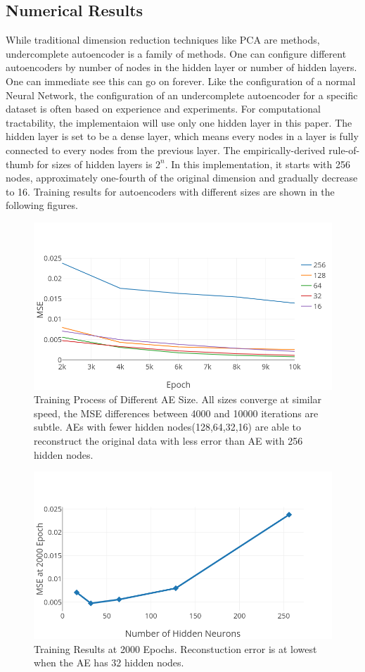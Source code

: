 \documentclass[11pt,a4paper]{article}
\theoremstyle{definition}
\numberwithin{equation}{section}
\begin{document}
	\subsection{Numerical Results}\label{sec:data_ana_res}
	While traditional dimension reduction techniques like PCA are methods, undercomplete autoencoder is a family of methods. One can configure different autoencoders by number of nodes in the hidden layer or number of hidden layers. One can immediate see this can go on forever. Like the configuration of a normal Neural Network, the configuration of an undercomplete autoencoder for a specific dataset is often based on experience and experiments. For computational tractability, the implementaion will use only one hidden layer in this paper. The hidden layer is set to be a dense layer, which means every nodes in a layer is fully connected to every nodes from the previous layer. The empirically-derived rule-of-thumb for sizes of hidden layers is $2^n$. In this implementation, it starts with 256 nodes, approximately one-fourth of the original dimension and gradually decrease to 16. Training results for autoencoders with different sizes are shown in the following figures.
	\begin{figure}[h!]
		\centering
		\includegraphics[width=.8\textwidth]{ae_mse.png}
		\caption{Training Process of Different AE Size. All sizes converge at similar speed, the MSE differences between 4000 and 10000 iterations are subtle. AEs with fewer hidden nodes(128,64,32,16) are able to reconstruct the original data with less error than AE with 256 hidden nodes.}
		\label{ae_res}
	\end{figure}
	
	\begin{figure}[h!]
		\centering
		\includegraphics[width=.8\textwidth]{ae_compare.png}
		\caption{Training Results at 2000 Epochs. Reconstuction error is at lowest when the AE has 32 hidden nodes. }
		\label{ae_res_1}
	\end{figure}
	
\end{document}
